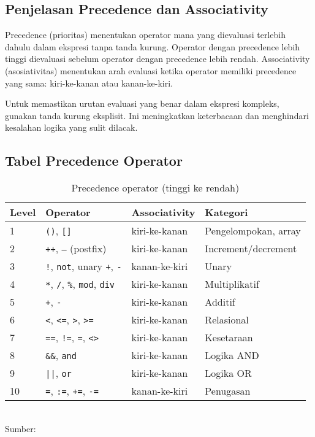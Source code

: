 \documentclass[../main.tex]{subfiles}
\begin{document}
\subsection{Penjelasan Precedence dan Associativity}
Precedence (prioritas) menentukan operator mana yang dievaluasi terlebih dahulu dalam ekspresi tanpa tanda kurung. Operator dengan precedence lebih tinggi dievaluasi sebelum operator dengan precedence lebih rendah. Associativity (asosiativitas) menentukan arah evaluasi ketika operator memiliki precedence yang sama: kiri-ke-kanan atau kanan-ke-kiri.

Untuk memastikan urutan evaluasi yang benar dalam ekspresi kompleks, gunakan tanda kurung eksplisit. Ini meningkatkan keterbacaan dan menghindari kesalahan logika yang sulit dilacak.

\subsection{Tabel Precedence Operator}
\begin{table}[H]
  \centering
  \caption{Precedence operator (tinggi ke rendah)}
  \begin{tabular}{@{}llll@{}}
    \toprule
    Level & Operator & Associativity & Kategori \\
    \midrule
    1 & \texttt{()}, \texttt{[]} & kiri-ke-kanan & Pengelompokan, array \\
    2 & \texttt{++}, \texttt{--} (postfix) & kiri-ke-kanan & Increment/decrement \\
    3 & \texttt{!}, \texttt{not}, unary \texttt{+}, \texttt{-} & kanan-ke-kiri & Unary \\
    4 & \texttt{*}, \texttt{/}, \texttt{\%}, \texttt{mod}, \texttt{div} & kiri-ke-kanan & Multiplikatif \\
    5 & \texttt{+}, \texttt{-} & kiri-ke-kanan & Additif \\
    6 & \texttt{<}, \texttt{<=}, \texttt{>}, \texttt{>=} & kiri-ke-kanan & Relasional \\
    7 & \texttt{==}, \texttt{!=}, \texttt{=}, \texttt{<>} & kiri-ke-kanan & Kesetaraan \\
    8 & \texttt{\&\&}, \texttt{and} & kiri-ke-kanan & Logika AND \\
    9 & \texttt{||}, \texttt{or} & kiri-ke-kanan & Logika OR \\
    10 & \texttt{=}, \texttt{:=}, \texttt{+=}, \texttt{-=} & kanan-ke-kiri & Penugasan \\
    \bottomrule
  \end{tabular}
  \\Sumber: \parencite{gnu-c-manual,cpp-op-precedence,c-op-precedence}
\end{table}
\end{document}
